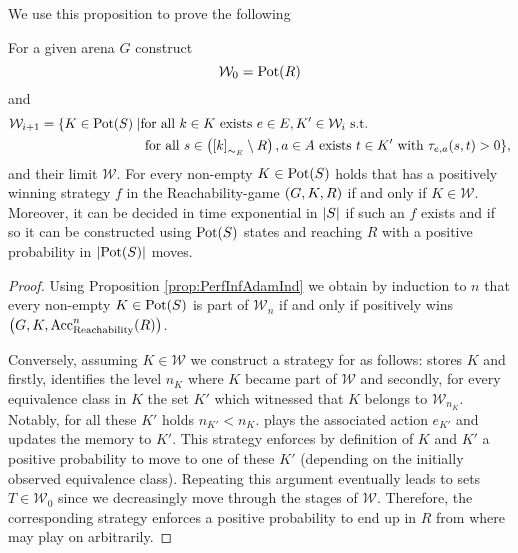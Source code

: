 We use this proposition to prove the following
\begin{theorem}
  For a given arena $G$ \eve{} construct
  \begin{equation*}
    \mathcal{W}_{0} = \operatorname{Pot}(R)
  \end{equation*}
  and
  \begin{align*}
    \mathcal{W}_{i + 1} = \{
      K\in\operatorname{Pot}(S)\mid&\text{for all }k\in K \text{ exists }e\in E, 
      K'\in\mathcal{W}_{i}\text{ s.t. }\\
      &\text{ for all }s\in\left(\left[k\right]_{\sim_{E}}\setminus R\right), a\in A
      \text{ exists }t\in K'\text{ with }\tau_{e, a}(s, t) > 0
    \},
  \end{align*}
  and their limit $\mathcal{W}$. For every non-empty $K\in\operatorname{Pot}(S)$ holds that
  \eve{} has a positively winning strategy $f$ in the Reachability-game 
  $\left(G, K, R\right)$ if and only if $K\in\mathcal{W}$. Moreover, it can be 
  decided in time exponential in $\left\vert{S}\right\vert$ if such an $f$ exists and if so
  it can be constructed using $\operatorname{Pot}(S)$ states and reaching $R$ with a positive
  probability in $\left\vert{\operatorname{Pot}(S)}\right\vert$ moves.
  \label{thm:PerfInfAdamReach}
\end{theorem}
\begin{proof}
  Using Proposition \ref{prop:PerfInfAdamInd} we obtain by induction to $n$ 
  that every non-empty $K\in\operatorname{Pot}(S)$ is part of $\mathcal{W}_{n}$ if and only
  if \eve{} positively wins $\left(G, K, \operatorname{Acc}_{\operatorname{Reachability}}^{n}(R)\right)$.

  Conversely, assuming $K\in\mathcal{W}$ we construct a strategy for \eve{} as
  follows: \eve{} stores $K$ and firstly, identifies the level $n_{K}$ where 
  $K$ became part of $\mathcal{W}$ and secondly, for every equivalence class in
  $K$ the set $K'$ which witnessed that $K$ belongs to $\mathcal{W}_{n_{K}}$.
  Notably, for all these $K'$ holds $n_{K'} < n_{K}$. \eve{} plays the 
  associated action $e_{K'}$ and updates the memory to $K'$. This strategy 
  enforces by definition of $K$ and $K'$ a positive probability to move to one 
  of these $K'$ (depending on the initially observed equivalence class). 
  Repeating this argument eventually leads to sets $T\in\mathcal{W}_{0}$ since 
  we decreasingly move through the stages of $\mathcal{W}$. Therefore, the 
  corresponding strategy enforces a positive probability to end up in $R$ from 
  where \eve{} may play on arbitrarily.
\end{proof}

